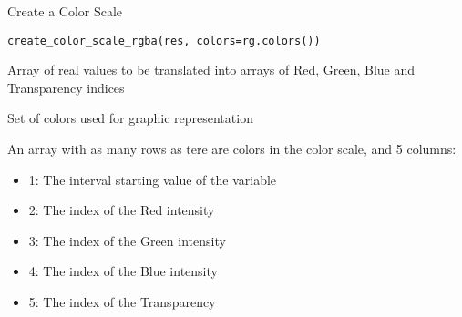 %
\begin{Description}\relax
Create a Color Scale
\end{Description}
%
\begin{Usage}
\begin{verbatim}
create_color_scale_rgba(res, colors=rg.colors())
\end{verbatim}
\end{Usage}
%
\begin{Arguments}
\begin{ldescription}
\item[\code{res}] 
Array of real values to be translated into arrays of Red, Green, Blue and
Transparency indices

\item[\code{colors}] 
Set of colors used for graphic representation

\end{ldescription}
\end{Arguments}
%
\begin{Value}
An array with as many rows as tere are colors in the color scale, and 5 columns:
\begin{itemize}

\item 1: The interval starting value of the variable
\item 2: The index of the Red intensity
\item 3: The index of the Green intensity
\item 4: The index of the Blue intensity
\item 5: The index of the Transparency

\end{itemize}

\end{Value}
